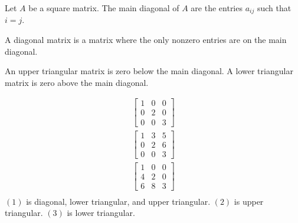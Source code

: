 \begin{definition}
    Let $A$ be a square matrix. The main diagonal of $A$ are the entries $a_{ij}$ such that $i=j$.
\end{definition}
\begin{definition}
    A diagonal matrix is a matrix where the only nonzero entries are on the main diagonal.
\end{definition}
\begin{definition}
    An upper triangular matrix is zero below the main diagonal. A lower triangular matrix is zero above the main diagonal.
\end{definition}
\begin{example}
    \begin{align*}
        \begin{bmatrix}
            1 & 0 & 0 \\
            0 & 2 & 0 \\
            0 & 0 & 3
        \end{bmatrix}\tag{1}\\
        \begin{bmatrix}
            1 & 3 & 5 \\
            0 & 2 & 6 \\
            0 & 0 & 3
        \end{bmatrix}\tag{2}\\
        \begin{bmatrix}
            1 & 0 & 0 \\
            4 & 2 & 0 \\
            6 & 8 & 3
        \end{bmatrix}\tag{3}\\
    \end{align*}
    $(1)$ is diagonal, lower triangular, and upper triangular. $(2)$ is upper triangular. $(3)$ is lower triangular.
\end{example}
